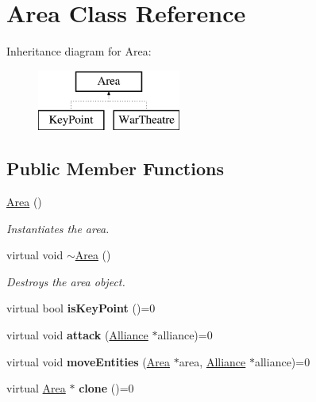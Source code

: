 \hypertarget{classArea}{}\section{Area Class Reference}
\label{classArea}
Inheritance diagram for Area\+:\begin{figure}[H]
\begin{center}
\leavevmode
\includegraphics[height=2.000000cm]{classArea}
\end{center}
\end{figure}
\subsection*{Public Member Functions}
\begin{DoxyCompactItemize}
\item 
\mbox{\label{classArea_aa92851fcffb0a9f1c6c8c283204f7003}} 
\hyperlink{classArea_aa92851fcffb0a9f1c6c8c283204f7003}{Area} ()
\begin{DoxyCompactList}\small\item\em Instantiates the area. \end{DoxyCompactList}\item 
\mbox{\label{classArea_a3c2f6940eb1f05981553ca4bc442bf61}} 
virtual void \hyperlink{classArea_a3c2f6940eb1f05981553ca4bc442bf61}{$\sim$\+Area} ()
\begin{DoxyCompactList}\small\item\em Destroys the area object. \end{DoxyCompactList}\item 
\mbox{\label{classArea_a5572fd57878be1d0d1f243de4be742db}} 
virtual bool {\bfseries is\+Key\+Point} ()=0
\item 
\mbox{\label{classArea_a1716b2f2d07575b44f0ad858f615e417}} 
virtual void {\bfseries attack} (\hyperlink{classAlliance}{Alliance} $\ast$alliance)=0
\item 
\mbox{\label{classArea_af51429707bbcbf7ec9349626eef87bd6}} 
virtual void {\bfseries move\+Entities} (\hyperlink{classArea}{Area} $\ast$area, \hyperlink{classAlliance}{Alliance} $\ast$alliance)=0
\item 
\mbox{\label{classArea_a383d61c76b8fac66ef903036d776a3a4}} 
virtual \hyperlink{classArea}{Area} $\ast$ {\bfseries clone} ()=0
\end{DoxyCompactItemize}


